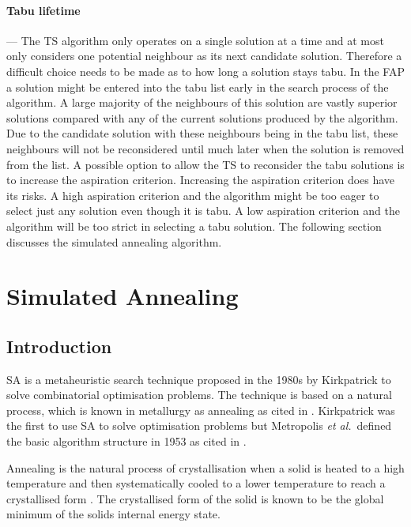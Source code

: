 \paragraph{Tabu lifetime}
--- The \gls{TS} algorithm only operates on a single solution at a time and at most only considers one potential neighbour as its next candidate solution. Therefore a difficult choice needs to be made as to how long a solution stays tabu. In the \gls{FAP} a solution might be entered into the tabu list early in the search process of the algorithm. A large majority of the neighbours of this solution are vastly superior solutions compared with any of the current solutions produced by the algorithm. Due to the candidate solution with these neighbours being in the tabu list, these neighbours will not be reconsidered until much later when the solution is removed from the list. A possible option to allow the \gls{TS} to reconsider the tabu solutions is to increase the aspiration criterion. Increasing the aspiration criterion does have its risks. A high aspiration criterion and the algorithm might be too eager to select just any solution even though it is tabu. A low aspiration criterion and the algorithm will be too strict in selecting a tabu solution. The following section discusses the simulated annealing algorithm.
\section{Simulated Annealing}
\label{sec:simulatedannealing}

\subsection{Introduction}
\label{sec:SAIntroduction}
\Gls{SA} is a metaheuristic search technique proposed in the 1980s by Kirkpatrick to solve combinatorial optimisation problems. The technique is based on a natural process, which is known in metallurgy as annealing as cited in \cite{SASingleMultiObj,TempCyclingSA}. Kirkpatrick was the first to use \gls{SA} to solve optimisation problems but Metropolis \emph{et al.}\ defined the basic algorithm structure in 1953 as cited in \cite{CurveFittingSA,VeryFastSAImageEnchancement}.

Annealing is the natural process of crystallisation when a solid is heated to a high temperature and then systematically cooled to a lower temperature to reach a crystallised form \cite{NewSAs,ConstantTempSA}. The crystallised form of the solid is known to be the global minimum of the solids internal energy state. 

